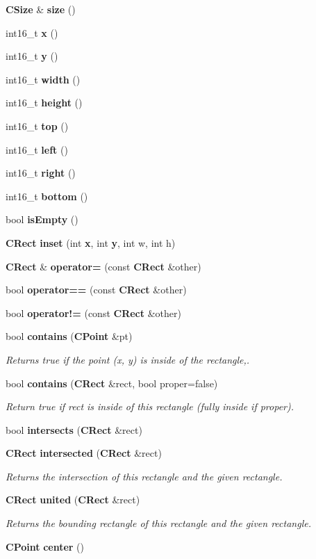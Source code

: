 \begin{DoxyCompactItemize}
\item 
{\bf C\-Size} \& {\bf size} ()
\item 
int16\-\_\-t {\bf x} ()
\item 
int16\-\_\-t {\bf y} ()
\item 
int16\-\_\-t {\bf width} ()
\item 
int16\-\_\-t {\bf height} ()
\item 
int16\-\_\-t {\bf top} ()
\item 
int16\-\_\-t {\bf left} ()
\item 
int16\-\_\-t {\bf right} ()
\item 
int16\-\_\-t {\bf bottom} ()
\item 
bool {\bf is\-Empty} ()
\item 
{\bf C\-Rect} {\bf inset} (int {\bf x}, int {\bf y}, int w, int h)
\item 
{\bf C\-Rect} \& {\bf operator=} (const {\bf C\-Rect} \&other)
\item 
bool {\bf operator==} (const {\bf C\-Rect} \&other)
\item 
bool {\bf operator!=} (const {\bf C\-Rect} \&other)
\item 
bool {\bf contains} ({\bf C\-Point} \&pt)
\begin{DoxyCompactList}\small\item\em Returns true if the point (x, y) is inside of the rectangle,. \end{DoxyCompactList}\item 
bool {\bf contains} ({\bf C\-Rect} \&rect, bool proper=false)
\begin{DoxyCompactList}\small\item\em Return true if rect is inside of this rectangle (fully inside if proper). \end{DoxyCompactList}\item 
bool {\bf intersects} ({\bf C\-Rect} \&rect)
\item 
{\bf C\-Rect} {\bf intersected} ({\bf C\-Rect} \&rect)
\begin{DoxyCompactList}\small\item\em Returns the intersection of this rectangle and the given rectangle. \end{DoxyCompactList}\item 
{\bf C\-Rect} {\bf united} ({\bf C\-Rect} \&rect)
\begin{DoxyCompactList}\small\item\em Returns the bounding rectangle of this rectangle and the given rectangle. \end{DoxyCompactList}\item 
{\bf C\-Point} {\bf center} ()
\end{DoxyCompactItemize}

